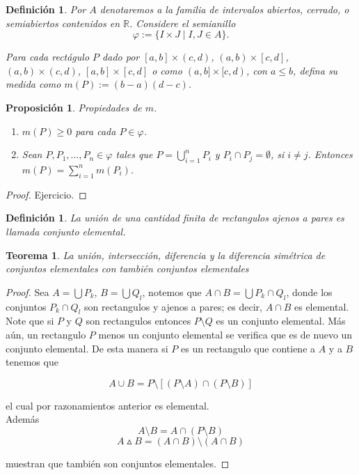 \documentclass[twoside,12pt,a4 paper,openright]{book}
\newtheorem{teo}[claim]{Teorema}
\newtheorem{pro}[claim]{Proposici\'on}
\newtheorem{defi}[claim]{Definici\'on}
\begin{document}
\begin{defi}
Por  $A$ denotaremos a la familia  de intervalos abiertos, cerrado, o semiabiertos contenidos en $\mathbb R$. Considere el semianillo    $$\varphi :=\{ I\times J \mid I,J\in A\}.$$ 

\noindent
Para  cada  rect\'agulo $P$ dado por  $[a,b]\times (c,d)$,
$(a,b)\times [c,d]$, $(a,b)\times (c,d)$, $[a,b]\times [c,d]$ o como $(a,b]\times [c,d)$,
 con $a\leq b$,  defina su medida como $m(P):= (b-a)(d-c)$.
\end{defi}



\begin{pro}
Propiedades de $m$.
\begin{enumerate}
\item  $m(P)\geq 0$ para cada $P\in \varphi$. 
\item  Sean $P, P_1, \dots, P_n \in \varphi$ tales que $\displaystyle P=\bigcup_{i=1}^n P_i$  y  $P_i \cap P_j = \emptyset$, si $i\neq j$. Entonces $m(P)= \sum_{i=1}^n m(P_i)$. 
\end{enumerate}
\end{pro}                                                                                                                                                                                                                                                                                                                                           
\begin{proof}
Ejercicio.
\end{proof}




\begin{defi}La uni\'on de una cantidad finita de rectangulos ajenos a pares es llamada   conjunto elemental.  
\end{defi}


\begin{teo}
La uni\'on, intersecci\'on, diferencia y la diferencia sim\'etrica de conjuntos elementales con tambi\'en conjuntos elementales 
\end{teo}
\begin{proof}
Sea $A = \bigcup P_k$, $B = \bigcup Q_l$, notemos que $A\cap B = \bigcup P_k \cap Q_l$, donde los conjuntos $P_k\cap Q_l$ son rectangulos y ajenos a pares; es decir, $A\cap B$ es elemental. Note que si $P$ y $Q$ son rectangulos entonces $P\setminus Q$ es un conjunto elemental. M\'as a\'un, un rectangulo $P$ menos un conjunto elemental se verifica que es de nuevo un conjunto elemental. De esta manera si $P$ es un rectangulo que contiene a $A$ y a $B$ tenemos que

$$A\cup B = P\setminus [(P\setminus A)\cap(P\setminus B)]$$

el cual por razonamientos anterior es elemental.\\

Adem\'as $$A \setminus B = A\cap (P\setminus B)$$
           $$ A \vartriangle B = (A\cap B)\setminus(A\cap B)$$

    muestran que tambi\'en son conjuntos elementales.
\end{proof}
\end{document}
